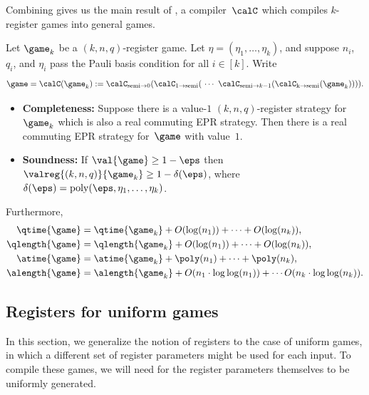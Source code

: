 Combining  gives us the main result of ,
a compiler~$\calC$ which compiles $k$-register games into general games.

\begin{theorem}\label{thm:registers}
Let $\game_k$ be a $(k, n, q)$-register game. 
Let $\eta = (\eta_1, \ldots, \eta_k)$, and suppose $n_i$, $q_i$, and $\eta_i$ pass the Pauli basis condition for all $i \in [k]$.
Write
\begin{equation*}
\game = \calC(\game_k) :=
\calC_{\mathrm{semi}\rightarrow 0}(\calC_{\mathrm{1} \rightarrow \mathrm{semi}}(~\cdots~
	\calC_{\mathrm{semi}\rightarrow k-1}(\calC_{\mathrm{k \rightarrow \mathrm{semi}}}(\game_k)))).
\end{equation*}
\begin{itemize}
\item[$\circ$] \textbf{Completeness:} Suppose there is a value-$1$ $(k,n,q)$-register strategy for $\game_{k}$ which is also a real commuting EPR strategy.
	Then there is a real commuting EPR strategy for~$\game$ with value~$1$.
\item[$\circ$] \textbf{Soundness:} If $\val{\game}\geq 1-\eps$ then $\valreg{(k,n,q)}{\game_{k}} \geq 1 -\delta(\eps)$, where $\delta(\eps) = \mathrm{poly}(\eps, \eta_1, \ldots, \eta_k)$.
\end{itemize}
Furthermore,
\begin{align*}
\qtime{\game} &= \qtime{\game_k} + O(\log(n_1))+ \cdots + O(\log(n_k)), \\
\qlength{\game} &= \qlength{\game_k} + O(\log(n_1)) + \cdots + O(\log(n_k)),  \\
\atime{\game} &= \atime{\game_k} + \poly(n_1) + \cdots + \poly(n_k),\\
\alength{\game} &= \alength{\game_k} + O(n_1 \cdot \log \log(n_1)) + \cdots O(n_k \cdot \log \log(n_k)).
\end{align*}
\end{theorem}

\subsection{Registers for uniform games}\label{sec:uniform-registers}

In this section, we generalize the notion of registers to the case of uniform games,
in which a different set of register parameters might be used for each input.
To compile these games, we will need for the register parameters themselves to be uniformly generated.

